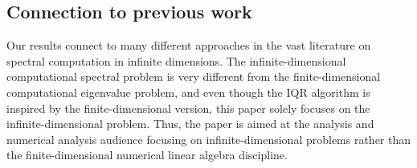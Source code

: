\documentclass[a4paper,10pt]{article}
\begin{document}
 



\subsection{Connection to previous work}
Our results connect to many different approaches in the vast literature on spectral computation in infinite dimensions. The infinite-dimensional computational spectral problem is very different from the finite-dimensional computational eigenvalue problem, and even though the IQR algorithm is inspired by the finite-dimensional version, this paper solely focuses on the infinite-dimensional problem. Thus, the paper is aimed at the analysis and numerical analysis audience focusing on infinite-dimensional problems rather than the finite-dimensional numerical linear algebra discipline. 
\end{document}

